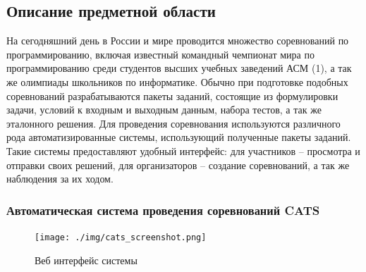 \documentclass{imcs}
\begin{document}
\subsection{Описание предметной области}

На сегодняшний день в России и мире проводится множество соревнований по программированию, включая известный командный чемпионат мира по программированию среди студентов высших учебных заведений АСМ (1), а так же олимпиады школьников по информатике. Обычно при подготовке подобных соревнований разрабатываются пакеты заданий, состоящие из формулировки задачи, условий к входным и выходным данным,  набора тестов, а так же эталонного решения. Для проведения соревнования используются различного рода автоматизированные системы, использующий полученные пакеты заданий. Такие системы предоставляют удобный интерфейс: для участников – просмотра и отправки своих решений, для организаторов – создание соревнований, а так же наблюдения за их ходом.
\subsubsection{Автоматическая система проведения соревнований CATS}
\begin{figure}[htb]
\centering
\texttt{[image: ./img/cats\_screenshot.png]}
\caption{Веб интерфейс системы}
\label{cats_screenshot}
\end{figure}
\end{document}
